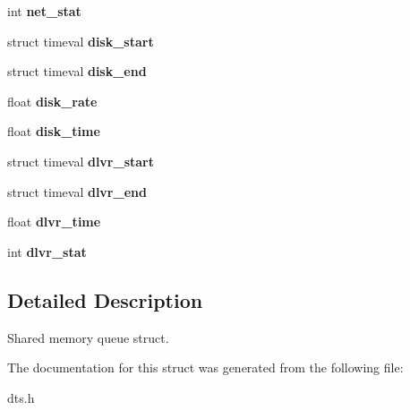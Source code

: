 \begin{CompactItemize}
\item 
\hypertarget{structshmQueueStat_20f889e8dc7c24f1951d257ba602f192}{
int \textbf{net\_\-stat}}
\label{structshmQueueStat_20f889e8dc7c24f1951d257ba602f192}

\item 
\hypertarget{structshmQueueStat_722d9eeb31b3ec3185aba6c09398ee2d}{
struct timeval \textbf{disk\_\-start}}
\label{structshmQueueStat_722d9eeb31b3ec3185aba6c09398ee2d}

\item 
\hypertarget{structshmQueueStat_990f4684a801a9b57ed50f1e21176a1f}{
struct timeval \textbf{disk\_\-end}}
\label{structshmQueueStat_990f4684a801a9b57ed50f1e21176a1f}

\item 
\hypertarget{structshmQueueStat_3f54f8ed398d166ec7a522403691340a}{
float \textbf{disk\_\-rate}}
\label{structshmQueueStat_3f54f8ed398d166ec7a522403691340a}

\item 
\hypertarget{structshmQueueStat_03ff9672874cb4de820645fda6d6bd70}{
float \textbf{disk\_\-time}}
\label{structshmQueueStat_03ff9672874cb4de820645fda6d6bd70}

\item 
\hypertarget{structshmQueueStat_fca6c52f5bcc581cca7043a3adcb1593}{
struct timeval \textbf{dlvr\_\-start}}
\label{structshmQueueStat_fca6c52f5bcc581cca7043a3adcb1593}

\item 
\hypertarget{structshmQueueStat_38cc5140cb352bd5ab26d23de5b3a49e}{
struct timeval \textbf{dlvr\_\-end}}
\label{structshmQueueStat_38cc5140cb352bd5ab26d23de5b3a49e}

\item 
\hypertarget{structshmQueueStat_64d1abffbe4039bb4d91c6a998761034}{
float \textbf{dlvr\_\-time}}
\label{structshmQueueStat_64d1abffbe4039bb4d91c6a998761034}

\item 
\hypertarget{structshmQueueStat_865072b21bd101369bcb62e4b361eac9}{
int \textbf{dlvr\_\-stat}}
\label{structshmQueueStat_865072b21bd101369bcb62e4b361eac9}

\end{CompactItemize}


\subsection{Detailed Description}
Shared memory queue struct. 

The documentation for this struct was generated from the following file:\begin{CompactItemize}
\item 
dts.h\end{CompactItemize}
